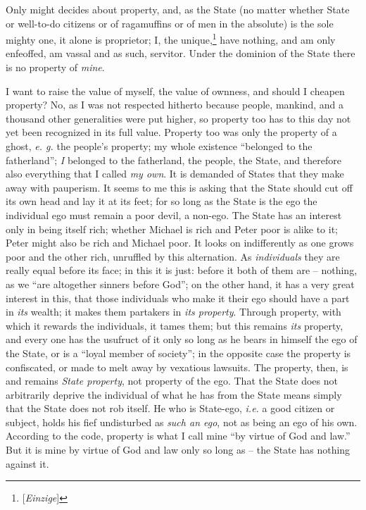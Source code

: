 \documentclass[12pt,a4paper]{book}
\begin{document}
Only might decides about property, and, as the State (no matter whether State 
or well-to-do citizens or of ragamuffins or of men in the absolute) is the 
sole mighty one, it alone is proprietor; I, the 
unique,\footnote{[\textit{Einzige}]} have nothing, and am only enfeoffed, am 
vassal and as such, servitor. Under the dominion of the State there is no 
property of \textit{mine}.

I want to raise the value of myself, the value of ownness, and should I 
cheapen property? No, as I was not respected hitherto because people, mankind, 
and a thousand other generalities were put higher, so property too has to this 
day not yet been recognized in its full value. Property too was only the 
property of a ghost, \textit{e. g.} the people's property; my whole existence 
``belonged to the fatherland''; \textit{I} belonged to the fatherland, the 
people, the State, and therefore also everything that I called \textit{my 
own}. It is demanded of States that they make away with pauperism. It seems to 
me this is asking that the State should cut off its own head and lay it at its 
feet; for so long as the State is the ego the individual ego must remain a 
poor devil, a non-ego. The State has an interest only in being itself rich; 
whether Michael is rich and Peter poor is alike to it; Peter might also be 
rich and Michael poor. It looks on indifferently as one grows poor and the 
other rich, unruffled by this alternation. As \textit{individuals} they are 
really equal before its face; in this it is just: before it both of them are 
-- nothing, as we ``are altogether sinners before God''; on the other hand, 
it has a very great interest in this, that those individuals who make it their 
ego should have a part in \textit{its} wealth; it makes them partakers in 
\textit{its property}. Through property, with which it rewards the 
individuals, it tames them; but this remains \textit{its} property, and every 
one has the usufruct of it only so long as he bears in himself the ego of the 
State, or is a ``loyal member of society''; in the opposite case the 
property is confiscated, or made to melt away by vexatious lawsuits. The 
property, then, is and remains \textit{State property}, not property of the 
ego. That the State does not arbitrarily deprive the individual of what he has 
from the State means simply that the State does not rob itself. He who is 
State-ego, \textit{i.e.} a good citizen or subject, holds his fief undisturbed 
as \textit{such an ego}, not as being an ego of his own. According to the 
code, property is what I call mine ``by virtue of God and law.'' But it is 
mine by virtue of God and law only so long as -- the State has nothing against 
it.
\end{document}

